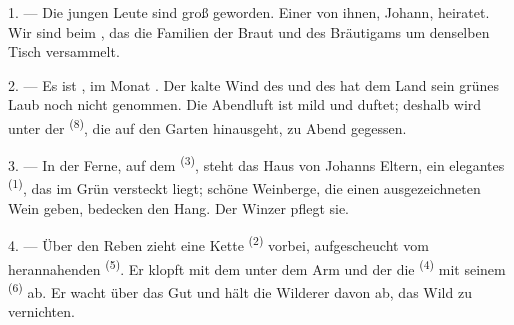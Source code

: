 %
%

\VUsaut{4.0mm}
\VUsaut{1.6mm}
\VUsaut{3.2mm}

\VUsaut{1.6mm}
\VUsaut{2.6mm}

\VUsaut{3.0mm}

1. --- Die jungen Leute sind groß geworden. Einer von ihnen, Johann, heiratet.
Wir sind beim , das die Familien der Braut und des
Bräutigams um denselben Tisch versammelt.

2. --- Es ist , im Monat . Der kalte Wind des
 und des  hat dem Land sein grünes Laub noch
nicht genommen. Die Abendluft ist mild und duftet; deshalb wird unter der
 \textsuperscript{(8)}, die auf den Garten hinausgeht, zu Abend
gegessen.

3. --- In der Ferne, auf dem  \textsuperscript{(3)}, steht das Haus von
Johanns Eltern, ein elegantes  \textsuperscript{(1)}, das im Grün
versteckt liegt; schöne Weinberge, die einen ausgezeichneten Wein geben, bedecken
den Hang. Der Winzer pflegt sie.

4. --- Über den Reben zieht eine Kette  \textsuperscript{(2)}
vorbei, aufgescheucht vom herannahenden  \textsuperscript{(5)}. Er
klopft mit dem  unter dem Arm und der
 die  \textsuperscript{(4)} mit
seinem  \textsuperscript{(6)} ab. Er wacht über das Gut und hält die
Wilderer davon ab, das Wild zu vernichten.

